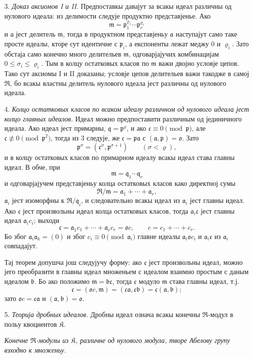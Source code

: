 \documentclass[11pt]{article}
\providecommand{\mR}{\mathfrak{R}}
\providecommand{\mK}{\mathfrak{K}}
\providecommand{\ma}{\mathfrak{a}}
\providecommand{\mb}{\mathfrak{b}}
\providecommand{\mc}{\mathfrak{c}}
\providecommand{\mm}{\mathfrak{m}}
\providecommand{\mo}{\mathfrak{o}}
\providecommand{\mq}{\mathfrak{q}}
\providecommand{\mpideal}{\mathfrak{p}}
\begin{document}
3. \emph{Доказ аксиомов I и II.} Предпоставкы давајут за всакы идеал различны од нулового идеала: из делимости следује продуктно представјенье. Ако
\[
        \mm=\mpideal_1^{\varrho_1}\cdots\mpideal_r^{\varrho_r}
\]
и $\ma$ јест делитель $\mm$, тогда в продуктном представјеньу $\ma$ наступајут само таке просте идеалы, кторе сут идентичне с $\mpideal_i$, а експоненты лежат меджу $0$ и $\varrho_i$. Зато обстаја само конечно много делительев $\mm$, одговарјајучих комбинацијам $0\le\sigma_i\le\varrho_i$. Тым в колцу остатковых класов по $\mm$ важи двојно условје цепов. Тако сут аксиомы I и II доказаны; условје цепов делительев важи такодже в самој $\mR$, бо всакы властны делитель нулового идеала јест различны од нулового идеала.

4. \emph{Колцо остатковых класов по всаком идеалу различном од нулового идеала јест колцо главных идеалов.} Идеал можно предпоставити различным од јединичного идеала. Ако идеал јест примарны, $\mq=\mpideal^\varrho$, и ако $\mc\equiv0\pmod{\mpideal}$, але $\mc\not\equiv0\pmod{\mpideal^2}$, тогда из 3 следује, же $\mc=\mpideal\ma$ с $(\ma,\mpideal)=\mo$. Зато
\[
        \mpideal^\sigma=(\mc^\sigma,\mpideal^{\sigma+1})
        \qquad(\sigma<\varrho),
\]
и в колцу остатковых класов по примарном идеалу всакы идеал става главны идеал. В обче, при
\[
        \mm=\mq_1\cdots\mq_r
\]
и одговарјајучем представјеньу колца остатковых класов како директној сумы
\[
        \mR/\mm=\ma_1+\cdots+\ma_r,
\]
$\ma_i$ јест изоморфны к $\mR/\mq_i$, и следовательно всакы идеал из $\ma_i$ јест главны идеал. Ако $\mc$ јест произвольны идеал колца остатковых класов, тогда $\ma_i\mc$ јест главны идеал $\ma_i c_i$; выходи
\[
        \mc=\ma_1c_1+\cdots+\ma_r c_r=\mo c,
        \qquad c=c_1+\cdots+c_r.
\]
Бо због $\ma_i\ma_k=(0)$ и због $c_i\equiv0\pmod{\ma_i}$ главне идеалы $\ma_i\mo c_i$ и $\ma_i\mc$ из $\ma_i$ совпадајут.

Тај теорем допушча још следујучу форму: ако $\mc$ јест произвольны идеал, можно јего преобразити в главны идеал множеньем с идеалом взаимно простым с даным идеалом $\mb$. Бо ако положимо $\mm=\mb\mc$, тогда $\mc$ модуло $\mm$ става главны идеал, т.ј.
\[
        \mc=(\mo c,\mm)=(\mc\ma,\mc\mb)=\mc(\ma,\mb);
\]
зато $\mo c=\mc\ma$ и $(\ma,\mb)=\mo$.

5. \emph{Теорија дробных идеалов.} Дробны идеал означа всакы конечны $\mR$-модул в польу квоциентов $\mK$.

\emph{Конечне $\mR$-модулы из $\mK$, различне од нулового модула, творе Абелову групу взходно к множеньу.}
\end{document}
